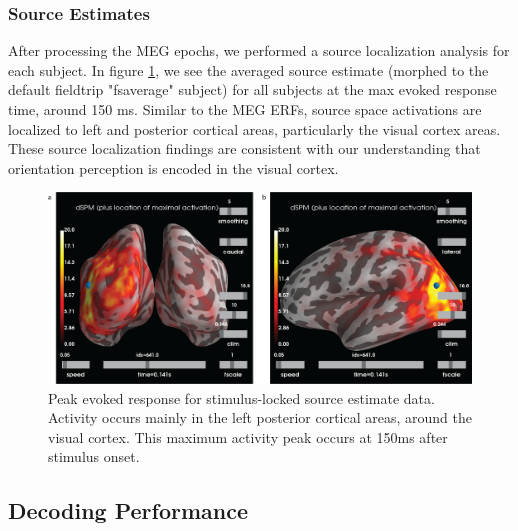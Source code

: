 \documentclass[../main.tex]{subfiles}
\begin{document}
\subsubsection{Source Estimates}
After processing the MEG epochs, we performed a source localization analysis for each subject. In figure \ref{source_max}, we see the averaged source estimate (morphed to the default fieldtrip "fsaverage" subject) for all subjects at the max evoked response time, around 150 ms. Similar to the MEG ERFs, source space activations are localized to left and posterior cortical areas, particularly the visual cortex areas. These source localization findings are consistent with our understanding that orientation perception is encoded in the visual cortex.

\begin{figure}
    \centering
    \includegraphics[scale=0.7]{figures/results/source_localiztion_results.png}
    \caption{Peak evoked response for stimulus-locked source estimate data. Activity occurs mainly in the left posterior cortical areas, around the visual cortex. This maximum activity peak occurs at 150ms after stimulus onset.}
    \label{source_max}
\end{figure}


\subsection{Decoding Performance}
\end{document}
